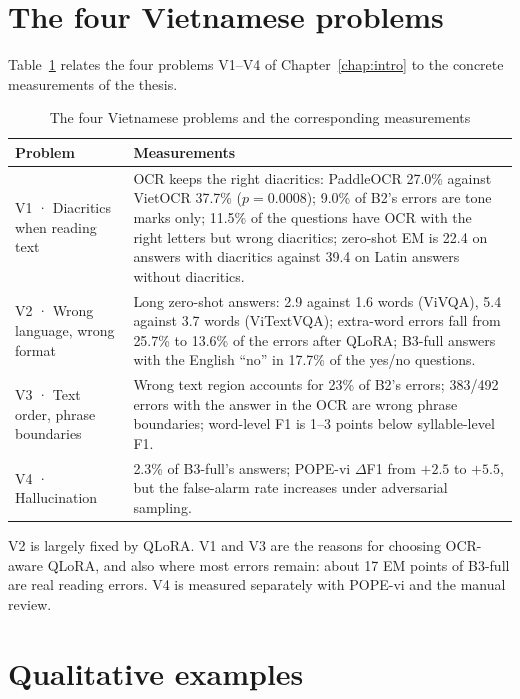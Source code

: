 \section{The four Vietnamese problems}
\label{sec:dis-v}

Table~\ref{tab:dis-v} relates the four problems V1--V4 of Chapter~\ref{chap:intro} to the
concrete measurements of the thesis.

\begin{table}[htbp]
\caption{The four Vietnamese problems and the corresponding measurements}
\label{tab:dis-v}
\centering
\small
\begin{tabular}{p{}p{}}
\toprule
\raggedright \textbf{Problem} & \raggedright \textbf{Measurements} \tabularnewline
\midrule
V1 · Diacritics when reading text &
OCR keeps the right diacritics: PaddleOCR 27.0\% against VietOCR 37.7\% ($p = 0.0008$);
9.0\% of B2's errors are tone marks only; 11.5\% of the questions have OCR with the right
letters but wrong diacritics; zero-shot EM is 22.4 on answers with diacritics against 39.4 on
Latin answers without diacritics. \\
V2 · Wrong language, wrong format &
Long zero-shot answers: 2.9 against 1.6 words (ViVQA), 5.4 against 3.7 words (ViTextVQA);
extra-word errors fall from 25.7\% to 13.6\% of the errors after QLoRA; B3-full answers with
the English ``no'' in 17.7\% of the yes/no questions. \\
V3 · Text order, phrase boundaries &
Wrong text region accounts for 23\% of B2's errors; 383/492 errors with the answer in the OCR
are wrong phrase boundaries; word-level F1 is 1--3 points below syllable-level F1. \\
V4 · Hallucination &
2.3\% of B3-full's answers; POPE-vi $\Delta$F1 from $+2.5$ to $+5.5$, but the false-alarm
rate increases under adversarial sampling. \\
\bottomrule
\end{tabular}
\end{table}

V2 is largely fixed by QLoRA. V1 and V3 are the reasons for choosing OCR-aware QLoRA, and
also where most errors remain: about 17 EM points of B3-full are real reading errors. V4 is
measured separately with POPE-vi and the manual review.

\section{Qualitative examples}
\label{sec:dis-examples}

